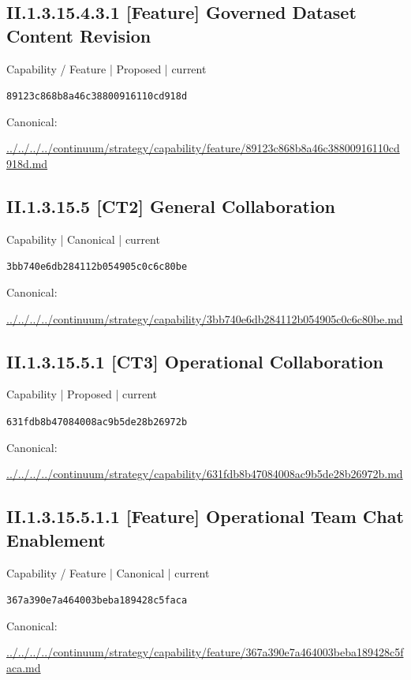 \documentclass[10pt,a4paper]{article}
\begin{document}
\subsection*{II.1.3.15.4.3.1 [Feature] Governed Dataset Content Revision}
{\small Capability / Feature | Proposed | current}\par
\texttt{89123c868b8a46c38800916110cd918d}\par
Canonical: \par
{\footnotesize\url{../../../../continuum/strategy/capability/feature/89123c868b8a46c38800916110cd918d.md}}\par
\subsection*{II.1.3.15.5 [CT2] General Collaboration}
{\small Capability | Canonical | current}\par
\texttt{3bb740e6db284112b054905c0c6c80be}\par
Canonical: \par
{\footnotesize\url{../../../../continuum/strategy/capability/3bb740e6db284112b054905c0c6c80be.md}}\par
\subsection*{II.1.3.15.5.1 [CT3] Operational Collaboration}
{\small Capability | Proposed | current}\par
\texttt{631fdb8b47084008ac9b5de28b26972b}\par
Canonical: \par
{\footnotesize\url{../../../../continuum/strategy/capability/631fdb8b47084008ac9b5de28b26972b.md}}\par
\subsection*{II.1.3.15.5.1.1 [Feature] Operational Team Chat Enablement}
{\small Capability / Feature | Canonical | current}\par
\texttt{367a390e7a464003beba189428c5faca}\par
Canonical: \par
{\footnotesize\url{../../../../continuum/strategy/capability/feature/367a390e7a464003beba189428c5faca.md}}\par
\end{document}
